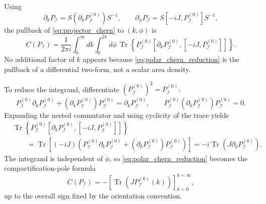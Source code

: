 \documentclass[11pt]{article}
\numberwithin{equation}{section}
\begin{document}
Using
\begin{equation}
  \partial_kP_{\mathcal I}
  =S(\partial_kP_{\mathcal I}^{(0)})S^{-1},
  \qquad
  \partial_\phi P_{\mathcal I}
  =S[-iJ,P_{\mathcal I}^{(0)}]S^{-1},
  \label{eq:projector_polar_derivatives}
\end{equation}
the pullback of \eqref{eq:projector_chern} to $(k,\phi)$ is
\begin{equation}
  C(P_{\mathcal I})=\frac{1}{2\pi i}
  \int_0^\infty dk\int_0^{2\pi}d\phi\,
  \operatorname{Tr}\!\left\{
  P_{\mathcal I}^{(0)}
  [\partial_kP_{\mathcal I}^{(0)},[-iJ,P_{\mathcal I}^{(0)}]]
  \right\}.
  \label{eq:polar_chern_reduction}
\end{equation}
No additional factor of $k$ appears because
\eqref{eq:polar_chern_reduction} is the pullback of a differential
two-form, not a scalar area density.

To reduce the integrand, differentiate
$(P_{\mathcal I}^{(0)})^2=P_{\mathcal I}^{(0)}$:
\begin{equation}
  P_{\mathcal I}^{(0)}\partial_kP_{\mathcal I}^{(0)}
  +(\partial_kP_{\mathcal I}^{(0)})P_{\mathcal I}^{(0)}
  =\partial_kP_{\mathcal I}^{(0)},
  \qquad
  P_{\mathcal I}^{(0)}(\partial_kP_{\mathcal I}^{(0)})
  P_{\mathcal I}^{(0)}=0.
\end{equation}
Expanding the nested commutator and using cyclicity of the trace yields
\begin{align}
  &\operatorname{Tr}\!\left\{
  P_{\mathcal I}^{(0)}
  [\partial_kP_{\mathcal I}^{(0)},[-iJ,P_{\mathcal I}^{(0)}]]
  \right\}\nonumber\\
  &\hspace{2em}=\operatorname{Tr}\!\left[
  (-iJ)\left(
  P_{\mathcal I}^{(0)}\partial_kP_{\mathcal I}^{(0)}
  +(\partial_kP_{\mathcal I}^{(0)})P_{\mathcal I}^{(0)}
  \right)\right]
  =-i\operatorname{Tr}(J\partial_kP_{\mathcal I}^{(0)}).
  \label{eq:nested_commutator_identity}
\end{align}
The integrand is independent of $\phi$, so
\eqref{eq:polar_chern_reduction} becomes the compactification-pole formula
\begin{equation}
  C(P_{\mathcal I})=
  -\left[
  \operatorname{Tr}(J P_{\mathcal I}^{(0)}(k))
  \right]_{k=0}^{k=\infty},
  \label{eq:pole_chern}
\end{equation}
up to the overall sign fixed by the orientation convention.
\end{document}

